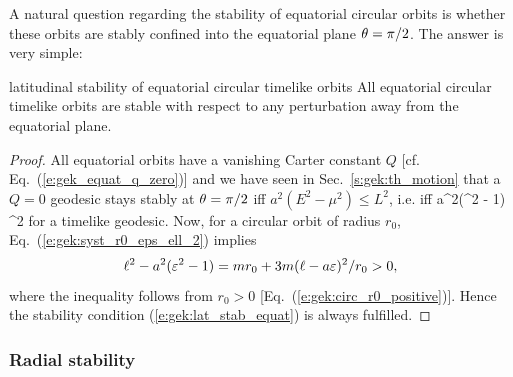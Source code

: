 A natural question regarding the stability of equatorial circular orbits
is whether these orbits are stably confined into the equatorial plane
$\theta=\pi/2$. The answer is very simple:
\begin{tprop}{latitudinal stability of equatorial circular timelike orbits}{}
All equatorial circular timelike orbits are stable with respect to any perturbation
away from the equatorial plane.
\end{tprop}

\begin{proof}
All equatorial orbits have a vanishing Carter constant $Q$
[cf. Eq.~(\ref{e:gek_equat_q_zero})] and we
have seen in Sec.~\ref{s:gek:th_motion} that a $Q=0$ geodesic stays stably at
$\theta=\pi/2$ iff $a^2(E^2 - \mu^2) \leq L^2$, i.e. iff
\be \label{e:gek:lat_stab_equat}
    a^2(\veps^2 - 1) \leq \ell^2
\ee
for a timelike geodesic.
Now, for a circular orbit of radius $r_0$,
Eq.~(\ref{e:gek:syst_r0_eps_ell_2}) implies
\[
   \ell^2 - a^2 (\varepsilon^2 - 1) = m r_0 + 3 m (\ell - a \varepsilon)^2 / r_0 > 0 ,
\]
where the inequality follows from
$r_0 > 0$ [Eq.~(\ref{e:gek:circ_r0_positive})].
Hence the stability condition (\ref{e:gek:lat_stab_equat}) is always fulfilled.
\end{proof}


\subsubsection{Radial stability}

